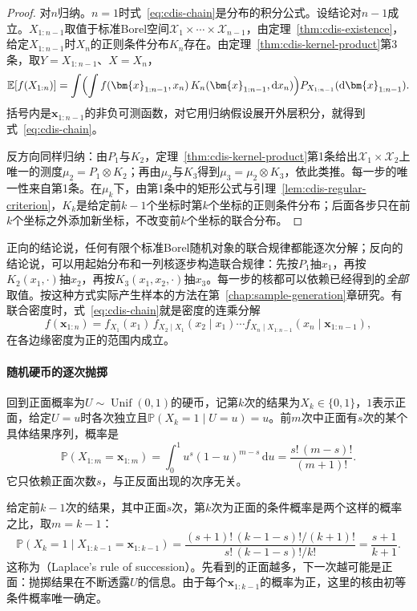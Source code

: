\begin{proof}
对$n$归纳。$n=1$时式~\eqref{eq:cdis-chain}是分布的积分公式。设结论对$n-1$成立。$X_{1:n-1}$取值于标准Borel空间$\mathcal{X}_1\times\cdots\times\mathcal{X}_{n-1}$，由定理~\ref{thm:cdis-existence}，给定$X_{1:n-1}$时$X_n$的正则条件分布$K_n$存在。由定理~\ref{thm:cdis-kernel-product}第3条，取$Y=X_{1:n-1}$、$X=X_n$，
\[
 \mathbb{E}[f(X_{1:n})]=\int\Bigl(\int f(\bm{x}_{1:n-1},x_n)\,K_n(\bm{x}_{1:n-1},\mathrm{d}x_n)\Bigr)P_{X_{1:n-1}}(\mathrm{d}\bm{x}_{1:n-1}).
\]
括号内是$\bm{x}_{1:n-1}$的非负可测函数，对它用归纳假设展开外层积分，就得到式~\eqref{eq:cdis-chain}。

反方向同样归纳：由$P_1$与$K_2$，定理~\ref{thm:cdis-kernel-product}第1条给出$\mathcal{X}_1\times\mathcal{X}_2$上唯一的测度$\mu_2=P_1\otimes K_2$；再由$\mu_2$与$K_3$得到$\mu_3=\mu_2\otimes K_3$，依此类推。每一步的唯一性来自第1条。在$\mu_k$下，由第1条中的矩形公式与引理~\ref{lem:cdis-regular-criterion}，$K_k$是给定前$k-1$个坐标时第$k$个坐标的正则条件分布；后面各步只在前$k$个坐标之外添加新坐标，不改变前$k$个坐标的联合分布。
\end{proof}

正向的结论说，任何有限个标准Borel随机对象的联合规律都能逐次分解；反向的结论说，可以用起始分布和一列核逐步构造联合规律：先按$P_1$抽$x_1$，再按$K_2(x_1,\cdot)$抽$x_2$，再按$K_3(x_1,x_2,\cdot)$抽$x_3$。每一步的核都可以依赖已经得到的\emph{全部}取值。按这种方式实际产生样本的方法在第~\ref{chap:sample-generation}章研究。有联合密度时，式~\eqref{eq:cdis-chain}就是密度的连乘分解
\[
 f(\bm{x}_{1:n})=f_{X_1}(x_1)\,f_{X_2\mid X_1}(x_2\mid x_1)\cdots f_{X_n\mid X_{1:n-1}}(x_n\mid\bm{x}_{1:n-1}),
\]
在各边缘密度为正的范围内成立。

\paragraph{随机硬币的逐次抛掷}
回到正面概率为$U\sim\operatorname{Unif}(0,1)$的硬币，记第$k$次的结果为$X_k\in\{0,1\}$，$1$表示正面，给定$U=u$时各次独立且$\mathbb{P}(X_k=1\mid U=u)=u$。前$m$次中正面有$s$次的某个具体结果序列，概率是
\[
 \mathbb{P}(X_{1:m}=\bm{x}_{1:m})=\int_0^1u^{s}(1-u)^{m-s}\,\mathrm{d}u=\frac{s!\,(m-s)!}{(m+1)!}.
\]
它只依赖正面次数$s$，与正反面出现的次序无关。

给定前$k-1$次的结果，其中正面$s$次，第$k$次为正面的条件概率是两个这样的概率之比，取$m=k-1$：
\begin{equation}
 \mathbb{P}(X_k=1\mid X_{1:k-1}=\bm{x}_{1:k-1})=\frac{(s+1)!\,(k-1-s)!/(k+1)!}{s!\,(k-1-s)!/k!}=\frac{s+1}{k+1}.
 \label{eq:cdis-succession}
\end{equation}
这称为（Laplace's rule of succession）。先看到的正面越多，下一次越可能是正面：抛掷结果在不断透露$U$的信息。由于每个$\bm{x}_{1:k-1}$的概率为正，这里的核由初等条件概率唯一确定。

